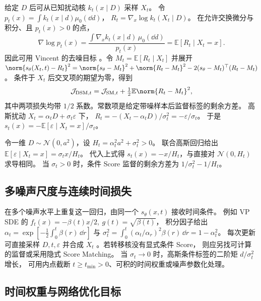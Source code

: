 给定 \(D\) 后可从已知扰动核 \(k_t(x\mid D)\) 采样 \(X_t\)。
令 \(p_t(x)=\int k_t(x\mid d)\mu_0(\dd d)\)，
\(R_t=\nabla_x\log k_t(X_t\mid D)\)。
在允许交换微分与积分、且 \(p_t(x)>0\) 的点，
\begin{equation}
  \nabla\log p_t(x)
  =\frac{\int \nabla_x k_t(x\mid d)\,\mu_0(\dd d)}{p_t(x)}
  =\mathbb E[R_t\mid X_t=x] .
  \label{eq:training-dsm-projection}
\end{equation}
因此可用 Vincent 的去噪目标 \cite{vincent2011dsm}。令
\(M_t=\mathbb E[R_t\mid X_t]\) 并展开
\(\norm{s_\theta(X_t,t)-R_t}^2=\norm{s_\theta-M_t}^2+
\norm{R_t-M_t}^2-2(s_\theta-M_t)^\top(R_t-M_t)\)。
条件于 \(X_t\) 后交叉项的期望为零，得到
\begin{equation}
  \mathcal J_{\mathrm{DSM},t}
   =\mathcal J_{\mathrm{SM},t}+\tfrac12\mathbb E\norm{R_t-M_t}^2 ,
  \label{eq:training-dsm-loss}
\end{equation}
其中两项损失均带 \(1/2\) 系数。常数项是给定带噪样本后监督标签的剩余方差。
高斯扰动 \(X_t=\alpha_tD+\sigma_t\varepsilon\) 下，
\(R_t=-(X_t-\alpha_tD)/\sigma_t^2=-\varepsilon/\sigma_t\)。
于是 \(s_t(x)=-\mathbb E[\varepsilon\mid X_t=x]/\sigma_t\)。

\pagebreak
\begin{example}[可验算的去噪回归]
令一维 \(D\sim\mathcal N(0,a^2)\)，设 \(H_t=\alpha_t^2a^2+\sigma_t^2>0\)。
联合高斯回归给出 \(\mathbb E[\varepsilon\mid X_t=x]=\sigma_t x/H_t\)。
代入上式得 \(s_t(x)=-x/H_t\)，与直接对 \(\mathcal N(0,H_t)\) 求导相同。
当 \(\sigma_t>0\) 时，条件 Score 监督的剩余方差为
\(1/\sigma_t^2-1/H_t\)。
\end{example}

\subsection{多噪声尺度与连续时间损失}

在多个噪声水平上重复这一回归，由同一个 \(s_\theta(x,t)\) 接收时间条件。
例如 VP SDE 的 \(f_t(x)=-\beta(t)x/2,\ g(t)=\sqrt{\beta(t)}\)，
积分因子给出
\(\alpha_t=\exp[-\frac12\int_0^t\beta(r)\,\dd r]\) 与
\(\sigma_t^2=\int_0^t(\alpha_t/\alpha_r)^2\beta(r)\,\dd r=1-\alpha_t^2\)。
每次更新可直接采样 \(D,t,\varepsilon\) 并合成 \(X_t\)
\cite{song2021sde}。若转移核没有显式条件 Score，
则应另找可计算的监督或采用隐式 Score Matching。
当 \(\sigma_t\to0\) 时，高斯条件标签的二阶矩 \(d/\sigma_t^2\) 增长，
可用内点截断 \(t\ge t_{\min}>0\)、可积的时间权重或噪声参数化处理。

\subsection{时间权重与网络优化目标}

